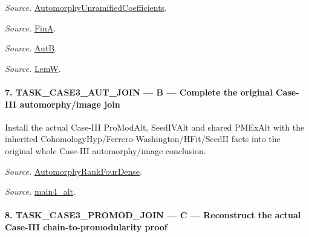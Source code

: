 \documentclass[11pt,a4paper]{article}
\numberwithin{equation}{section}
\theoremstyle{remark}\newtheorem{remark}[theorem]{Remark}
\begin{document}
\emph{Source.} \href{https://github.com/CocoSgt/riemann-hypothesis-lean/blob/7cbf7a0c32fca1badf05931879a37c3f8a2b03b4/src/Development/AutomorphicArithmetic/AutomorphicVarieties/AutomorphicCases/AutomorphyUnramifiedCoefficients.lean#L24-L27}{AutomorphyUnramifiedCoefficients}.

\emph{Source.} \href{https://github.com/CocoSgt/riemann-hypothesis-lean/blob/7cbf7a0c32fca1badf05931879a37c3f8a2b03b4/src/Development/AutomorphicArithmetic/AutomorphicVarieties/AutomorphicCases/AutomorphyUnramifiedCoefficients.lean#L12-L13}{FinA}.

\emph{Source.} \href{https://github.com/CocoSgt/riemann-hypothesis-lean/blob/7cbf7a0c32fca1badf05931879a37c3f8a2b03b4/src/Development/AutomorphicArithmetic/AutomorphicVarieties/AutomorphicCases/AutomorphyUnramifiedCoefficients.lean#L15-L17}{AutB}.

\emph{Source.} \href{https://github.com/CocoSgt/riemann-hypothesis-lean/blob/7cbf7a0c32fca1badf05931879a37c3f8a2b03b4/src/Development/AutomorphicArithmetic/AutomorphicVarieties/AutomorphicCases/AutomorphyUnramifiedCoefficients.lean#L19-L22}{LemW}.



\paragraph{7. TASK\_\allowbreak CASE3\_\allowbreak AUT\_\allowbreak JOIN — B — Complete the original Case-III automorphy/image join}

Install the actual Case-III ProModAlt, SeedIVAlt and shared PMExAlt with the inherited CohomologyHyp/Ferrero-Washington/HFit/SeedII facts into the original whole Case-III automorphy/image conclusion.

\emph{Source.} \href{https://github.com/CocoSgt/riemann-hypothesis-lean/blob/7cbf7a0c32fca1badf05931879a37c3f8a2b03b4/src/Development/AutomorphicArithmetic/AutomorphicVarieties/ModularityArgument/ThresholdArguments/DenseThresholdCases/PromodularityCaseThree.lean#L43-L44}{AutomorphyRankFourDense}.

\emph{Source.} \href{https://github.com/CocoSgt/riemann-hypothesis-lean/blob/7cbf7a0c32fca1badf05931879a37c3f8a2b03b4/src/Development/AutomorphicArithmetic/AutomorphicVarieties/ModularityArgument/ThresholdArguments/DenseThresholdCases/CuFinal.lean#L44-L44}{main4\_\allowbreak alt}.



\paragraph{8. TASK\_\allowbreak CASE3\_\allowbreak PROMOD\_\allowbreak JOIN — C — Reconstruct the actual Case-III chain-to-promodularity proof}
\end{document}
